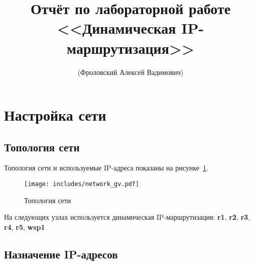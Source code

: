 \documentclass[a4paper,12pt]{article}
\title{Отчёт по лабораторной работе \\ <<Динамическая IP-маршрутизация>>}
\author{(Фроловский Алексей Вадимович)}
\begin{document}
\maketitle

\tableofcontents

\section{Настройка сети}

\subsection{Топология сети}

Топология сети и используемые IP-адреса показаны на рисунке~\ref{fig:network}.

\begin{figure}
\centering
\texttt{[image: includes/network\_gv.pdf]}
\caption{Топология сети}
\label{fig:network}
\end{figure}

На следующих узлах используется динамическая IP-маршрутизация: 
\textbf{r1}, \textbf{r2}, \textbf{r3}, \textbf{r4}, \textbf{r5}, \textbf{wsp1}

\subsection{Назначение IP-адресов}
\end{document}
